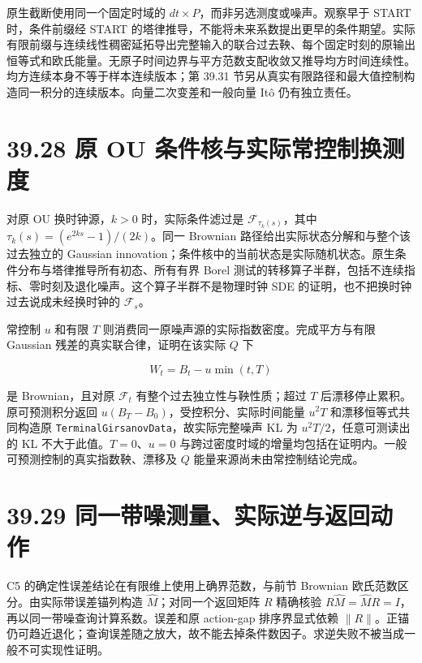 \documentclass[
  11pt,
  oneside]{book}
\begin{document}
原生截断使用同一个固定时域的 \(dt\times P\)，而非另选测度或噪声。观察早于 START 时，条件前缀经 START 的塔律推导，不能将未来系数提出更早的条件期望。实际有限前缀与连续线性稠密延拓导出完整输入的联合过去鞅、每个固定时刻的原输出恒等式和欧氏能量。无原子时间边界与平方范数支配收敛又推导均方时间连续性。均方连续本身不等于样本连续版本；第 39.31 节另从真实有限路径和最大值控制构造同一积分的连续版本。向量二次变差和一般向量 Itô 仍有独立责任。

\section{39.28 原 OU 条件核与实际常控制换测度}\label{ux539f-ou-ux6761ux4ef6ux6838ux4e0eux5b9eux9645ux5e38ux63a7ux5236ux6362ux6d4bux5ea6}

对原 OU 换时钟源，\(k>0\) 时，实际条件滤过是 \(\mathcal F_{\tau_k(s)}\)，其中 \(\tau_k(s)=(e^{2ks}-1)/(2k)\)。同一 Brownian 路径给出实际状态分解和与整个该过去独立的 Gaussian innovation；条件核中的当前状态是实际随机状态。原生条件分布与塔律推导所有初态、所有有界 Borel 测试的转移算子半群，包括不连续指标、零时刻及退化噪声。这个算子半群不是物理时钟 SDE 的证明，也不把换时钟过去说成未经换时钟的 \(\mathcal F_s\)。

常控制 \(u\) 和有限 \(T\) 则消费同一原噪声源的实际指数密度。完成平方与有限 Gaussian 残差的真实联合律，证明在该实际 \(Q\) 下

\[W_t=B_t-u\min(t,T)\]

是 Brownian，且对原 \(\mathcal F_t\) 有整个过去独立性与鞅性质；超过 \(T\) 后漂移停止累积。原可预测积分返回 \(u(B_T-B_0)\)，受控积分、实际时间能量 \(u^2T\) 和漂移恒等式共同构造原 \nolinkurl{TerminalGirsanovData}，故实际完整噪声 KL 为 \(u^2T/2\)，任意可测读出的 KL 不大于此值。\(T=0\)、\(u=0\) 与跨过密度时域的增量均包括在证明内。一般可预测控制的真实指数鞅、漂移及 \(Q\) 能量来源尚未由常控制结论完成。

\section{39.29 同一带噪测量、实际逆与返回动作}\label{ux540cux4e00ux5e26ux566aux6d4bux91cfux5b9eux9645ux9006ux4e0eux8fd4ux56deux52a8ux4f5c}

C5 的确定性误差结论在有限维上使用上确界范数，与前节 Brownian 欧氏范数区分。由实际带误差锚列构造 \(\widehat M\)；对同一个返回矩阵 \(R\) 精确核验 \(R\widehat M=\widehat M R=I\)，再以同一带噪查询计算系数。误差和原 action-gap 排序界显式依赖 \(\lVert R\rVert\)。正锚仍可趋近退化；查询误差随之放大，故不能去掉条件数因子。求逆失败不被当成一般不可实现性证明。
\end{document}

